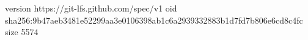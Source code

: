 version https://git-lfs.github.com/spec/v1
oid sha256:9b47aeb3481e52299aa3e0106398ab1c6a2939332883b1d7fd7b806e6cd8c4fc
size 5574
